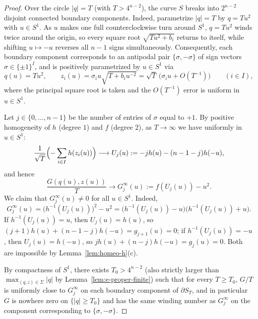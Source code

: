 \documentclass[11pt,a4paper]{amsart}
\numberwithin{equation}{section}
\theoremstyle{definition}
\begin{document}
\begin{proof}
Over the circle $|q| = T$ (with $T > 4^{n-2}$), the curve $S$ breaks into $2^{n-2}$ disjoint connected boundary components. Indeed, parametrize $|q| = T$ by $q = T u^2$ with $u \in S^1$. As $u$ makes one full counterclockwise turn around $S^1$, $q = T u^2$ winds twice around the origin, so every square root $\sqrt{T u^2 + b_i}$ returns to itself, while shifting $u \mapsto -u$ reverses all $n-1$ signs simultaneously. Consequently, each boundary component corresponds to an antipodal pair $\{\sigma, -\sigma\}$ of sign vectors $\sigma \in \{\pm 1\}^I$, and is positively parametrized by $u \in S^1$ via
\[
q(u) = T u^2, \qquad z_i(u) = \sigma_i u \sqrt{T + b_i u^{-2}} = \sqrt{T}\,\bigl(\sigma_i u + O(T^{-1})\bigr) \qquad (i \in I),
\]
where the principal square root is taken and the $O(T^{-1})$ error is uniform in $u \in S^1$.

Let $j \in \{0, \dots, n-1\}$ be the number of entries of $\sigma$ equal to $+1$. By positive homogeneity of $h$ (degree $1$) and $f$ (degree $2$), as $T \to \infty$ we have uniformly in $u \in S^1$:
\[
\frac{1}{\sqrt{T}} \Bigl(-\sum_{i \in I} h(z_i(u))\Bigr) \longrightarrow U_j(u) := -j h(u) - (n-1-j) h(-u),
\]
and hence
\[
\frac{G(q(u), z(u))}{T} \longrightarrow G^\infty_j(u) := f(U_j(u)) - u^2.
\]
We claim that $G^\infty_j(u) \ne 0$ for all $u \in S^1$. Indeed,
\[
G^\infty_j(u) = \bigl(h^{-1}(U_j(u))\bigr)^2 - u^2 = \bigl(h^{-1}(U_j(u)) - u\bigr)\bigl(h^{-1}(U_j(u)) + u\bigr).
\]
If $h^{-1}(U_j(u)) = u$, then $U_j(u) = h(u)$, so $(j+1) h(u) + (n-1-j) h(-u) = g_{j+1}(u) = 0$; if $h^{-1}(U_j(u)) = -u$, then $U_j(u) = h(-u)$, so $j h(u) + (n-j) h(-u) = g_j(u) = 0$. Both are impossible by Lemma~\ref{lem:homeo-h}(c).

By compactness of $S^1$, there exists $T_0 > 4^{n-2}$ (also strictly larger than $\max_{(q,z) \in \Sigma} |q|$ by Lemma~\ref{lem:e-proper-finite}) such that for every $T \ge T_0$, $G/T$ is uniformly close to $G^\infty_j$ on each boundary component of $\partial S_T$, and in particular $G$ is nowhere zero on $\{|q| \ge T_0\}$ and has the same winding number as $G^\infty_j$ on the component corresponding to $\{\sigma, -\sigma\}$.


\end{proof}
\end{document}

